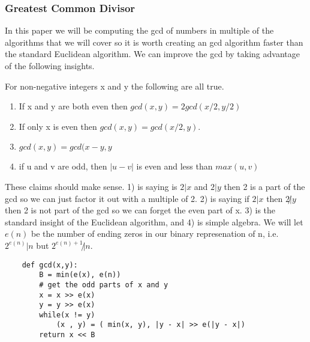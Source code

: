 \documentclass{article}
\begin{document}
\subsubsection{Greatest Common Divisor}
In this paper we will be computing the gcd of numbers in multiple of the algorithms that we will cover so it is worth creating an gcd algorithm faster than the standard Euclidean algorithm. We can improve the gcd by taking advantage of the following insights.
\begin{theorem}
    For non-negative integers x and y the following are all true.
    \begin{enumerate}
        \item If x and y are both even then $gcd(x,y) = 2 gcd(x/2, y/2)$
        \item If only x is even then $gcd(x,y) = gcd(x/2, y)$.
        \item $gcd(x,y) = gcd(x-y, y$
        \item if u and v are odd, then $| u - v|$ is even and less than $max(u,v)$
    \end{enumerate}\cite{stein1967computational} \cite{knuth1997art}
\end{theorem}
These claims should make sense. 1) is saying is $2|x$ and $2|y$ then 2 is a part of the gcd so we can just factor it out with a multiple of 2. 2) is saying if $2| x$ then $2 \not | y$ then 2 is not part of the gcd so we can forget the even part of x. 3) is the standard insight of the Euclidean algorithm, and 4) is simple algebra. We will let $e(n)$ be the number of ending zeros in our binary represenation of n, i.e. $2^{e(n)} | n$ but $2^{e(n) + 1} \not | n$.  
\begin{verbatim}
    def gcd(x,y):
        B = min(e(x), e(n))
        # get the odd parts of x and y
        x = x >> e(x)
        y = y >> e(x)
        while(x != y)
            (x , y) = ( min(x, y), |y - x| >> e(|y - x|)
        return x << B
\end{verbatim}
\end{document}

